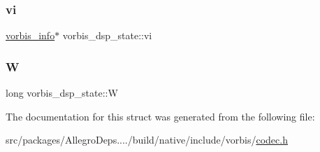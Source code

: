 \subsubsection{\texorpdfstring{vi}{vi}}
{\footnotesize\ttfamily \hyperlink{structvorbis__info}{vorbis\+\_\+info}$\ast$ vorbis\+\_\+dsp\+\_\+state\+::vi}

\mbox{\label{structvorbis__dsp__state_a1cc3a520dcf831fb967341e5095c7b38}} 
\subsubsection{\texorpdfstring{W}{W}}
{\footnotesize\ttfamily long vorbis\+\_\+dsp\+\_\+state\+::W}



The documentation for this struct was generated from the following file\+:\begin{DoxyCompactItemize}
\item 
src/packages/\+Allegro\+Deps..../build/native/include/vorbis/\hyperlink{vorbis_2codec_8h}{codec.\+h}\end{DoxyCompactItemize}
